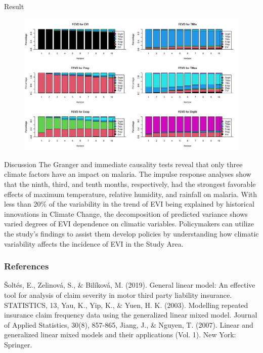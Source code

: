 \documentclass[11pt]{beamer}
\begin{document}
\begin{frame}{Result}
	\begin{figure}
		\centering
		\includegraphics[width=0.7\linewidth]{images/fevd}
		\caption{}
		\label{fig:fevd}
	\end{figure}
\end{frame}
\begin{frame}{Discussion}
	The Granger and immediate causality tests reveal that only three climate factors have an impact on malaria. The impulse response analyses show that the ninth, third, and tenth months, respectively, had the strongest favorable effects of maximum temperature, relative humidity, and rainfall on malaria. With less than 20\% of the variability in the trend of EVI being explained by historical innovations in Climate Change, the decomposition of predicted variance shows varied degrees of EVI dependence on climatic variables. Policymakers can utilize the study's findings to assist them develop policies by understanding how climatic variability affects the incidence of EVI in the Study Area.

\end{frame}
\begin{frame}
	\frametitle{References}
	\begin{thebibliography}{9}
		Šoltés, E., Zelinová, S., $\&$ Bilíková, M. (2019). General linear model: An effective tool for analysis of claim severity in motor third party liability insurance. STATISTICS, 13,
		Yau, K., Yip, K., $\&$ Yuen, H. K. (2003). Modelling repeated insurance claim frequency data using the generalized linear mixed model. Journal of Applied Statistics, 30(8), 857-865,	
		Jiang, J., $\&$ Nguyen, T. (2007). Linear and generalized linear mixed models and their applications (Vol. 1). New York: Springer.
	\end{thebibliography}
\end{frame}
\end{document}
